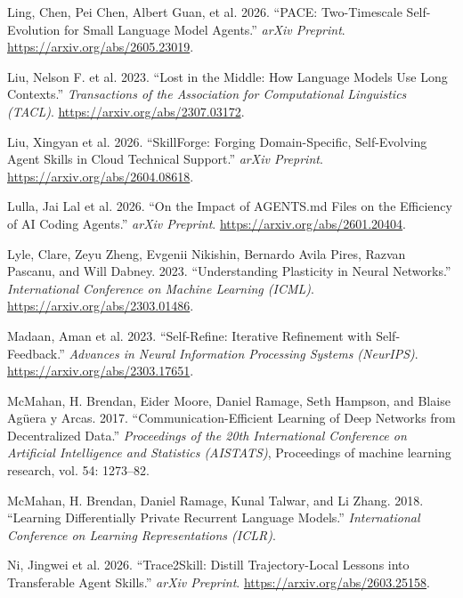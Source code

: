 \documentclass[
]{article}
\newlength{\cslhangindent}
\newenvironment{CSLReferences}[2] %
 {\begin{list}{}{%
  \setlength{\itemindent}{0pt}
  \setlength{\leftmargin}{0pt}
  \setlength{\parsep}{0pt}
  \ifodd #1
   \setlength{\leftmargin}{\cslhangindent}
   \setlength{\itemindent}{-1\cslhangindent}
  \fi
  \setlength{\itemsep}{#2\baselineskip}}}
 {\end{list}}
\begin{document}
\begin{CSLReferences}{1}{1}
Ling, Chen, Pei Chen, Albert Guan, et al. 2026. {``{PACE}: Two-Timescale
Self-Evolution for Small Language Model Agents.''} \emph{arXiv
Preprint}. \url{https://arxiv.org/abs/2605.23019}.

{Liu, Nelson F. et al.} 2023. {``Lost in the Middle: How Language Models
Use Long Contexts.''} \emph{Transactions of the Association for
Computational Linguistics (TACL)}.
\url{https://arxiv.org/abs/2307.03172}.

{Liu, Xingyan et al.} 2026. {``{SkillForge}: Forging Domain-Specific,
Self-Evolving Agent Skills in Cloud Technical Support.''} \emph{arXiv
Preprint}. \url{https://arxiv.org/abs/2604.08618}.

{Lulla, Jai Lal et al.} 2026. {``On the Impact of {AGENTS.md} Files on
the Efficiency of {AI} Coding Agents.''} \emph{arXiv Preprint}.
\url{https://arxiv.org/abs/2601.20404}.

Lyle, Clare, Zeyu Zheng, Evgenii Nikishin, Bernardo Avila Pires, Razvan
Pascanu, and Will Dabney. 2023. {``{Understanding Plasticity in Neural
Networks}.''} \emph{International Conference on Machine Learning
(ICML)}. \url{https://arxiv.org/abs/2303.01486}.

{Madaan, Aman et al.} 2023. {``Self-Refine: Iterative Refinement with
Self-Feedback.''} \emph{Advances in Neural Information Processing
Systems (NeurIPS)}. \url{https://arxiv.org/abs/2303.17651}.

McMahan, H. Brendan, Eider Moore, Daniel Ramage, Seth Hampson, and
Blaise Agüera y Arcas. 2017. {``Communication-Efficient Learning of Deep
Networks from Decentralized Data.''} \emph{Proceedings of the 20th
International Conference on Artificial Intelligence and Statistics
(AISTATS)}, Proceedings of machine learning research, vol. 54: 1273--82.

McMahan, H. Brendan, Daniel Ramage, Kunal Talwar, and Li Zhang. 2018.
{``Learning Differentially Private Recurrent Language Models.''}
\emph{International Conference on Learning Representations (ICLR)}.

{Ni, Jingwei et al.} 2026. {``{Trace2Skill}: Distill Trajectory-Local
Lessons into Transferable Agent Skills.''} \emph{arXiv Preprint}.
\url{https://arxiv.org/abs/2603.25158}.


\end{CSLReferences}
\end{document}
